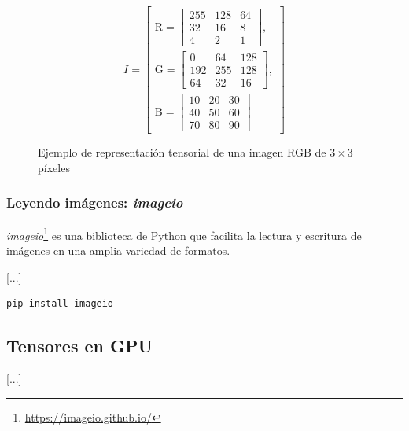 \begin{figure}[h]
	\centering
	\begin{minipage}{0.6\textwidth}
		\[
			I =
			\left[
				\begin{array}{l}
					\text{R} =
					\begin{bmatrix}
						255 & 128 & 64 \\
						32  & 16  & 8  \\
						4   & 2   & 1
					\end{bmatrix},  \\[2em]
					\text{G} =
					\begin{bmatrix}
						0   & 64  & 128 \\
						192 & 255 & 128 \\
						64  & 32  & 16
					\end{bmatrix}, \\[2em]
					\text{B} =
					\begin{bmatrix}
						10 & 20 & 30 \\
						40 & 50 & 60 \\
						70 & 80 & 90
					\end{bmatrix}
				\end{array}
				\right]
		\]
	\end{minipage}
	\caption{Ejemplo de representación tensorial de una imagen RGB de $3 \times 3$ píxeles}
	\label{fig:image_tensor_example}
\end{figure}

\newpage
\subsubsection{Leyendo imágenes: \textit{imageio}} \label{sec:intro_imageio}
\textit{imageio}\footnote{\url{https://imageio.github.io/}} es una biblioteca de Python que facilita la lectura y escritura de 
imágenes en una amplia variedad de formatos.

[...]

\begin{lstlisting}[language=bash, caption={Comando de instalación de \textit{imageio}}, label={lst: intro_install_imageio}]
pip install imageio
\end{lstlisting}

\subsection{Tensores en GPU} \label{sec:intro_tensors_gpu}
[...]

